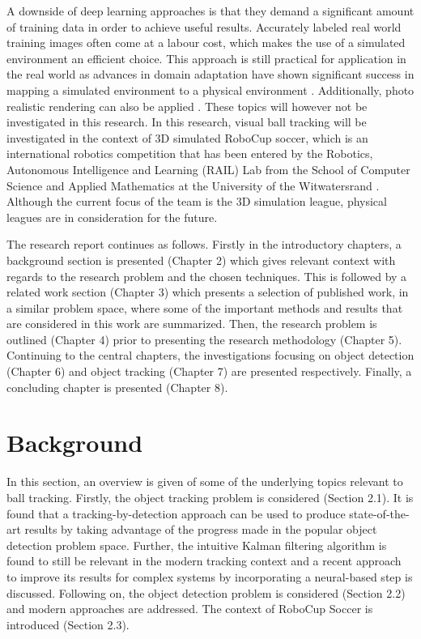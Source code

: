\documentclass[a4paper,twoside,12pt]{report}
\begin{document}
A downside of deep learning approaches is that they demand a significant amount of training data in order to achieve useful results. Accurately labeled real world training images often come at a labour cost, which makes the use of a simulated environment an efficient choice. This approach is still practical for application in the real world as advances in domain adaptation have shown significant success in mapping a simulated environment to a physical environment \citep{domainadpt}. Additionally, photo realistic rendering can also be applied \citep{sim4cv}. These topics will however not be investigated in this research. In this research, visual ball tracking will be investigated in the context of 3D simulated RoboCup soccer, which is an international robotics competition that has been entered by the Robotics, Autonomous Intelligence and Learning (RAIL) Lab from the School of Computer Science and Applied Mathematics at the University of the Witwatersrand \citep{witsfc}. Although the current focus of the team is the 3D simulation league, physical leagues are in consideration for the future. 

The research report continues as follows. Firstly in the introductory chapters, a background section is presented (Chapter 2) which gives relevant context with regards to the research problem and the chosen techniques. This is followed by a related work section (Chapter 3) which presents a selection of published work, in a similar problem space, where some of the important methods and results that are considered in this work are summarized. Then, the research problem is outlined (Chapter 4) prior to presenting the research methodology (Chapter 5). Continuing to the central chapters, the investigations focusing on object detection (Chapter 6) and object tracking (Chapter 7) are presented respectively. Finally, a concluding chapter is presented (Chapter 8).

\chapter{Background}

In this section, an overview is given of some of the underlying topics relevant to ball tracking. Firstly, the object tracking problem is considered (Section 2.1). It is found that a tracking-by-detection approach can be used to produce state-of-the-art results by taking advantage of the progress made in the popular object detection problem space. Further, the intuitive Kalman filtering algorithm is found to still be relevant in the modern tracking context and a recent approach to improve its results for complex systems by incorporating a neural-based step is discussed. Following on, the object detection problem is considered  (Section 2.2) and modern approaches are addressed. The context of RoboCup Soccer is introduced (Section 2.3).
\end{document}
